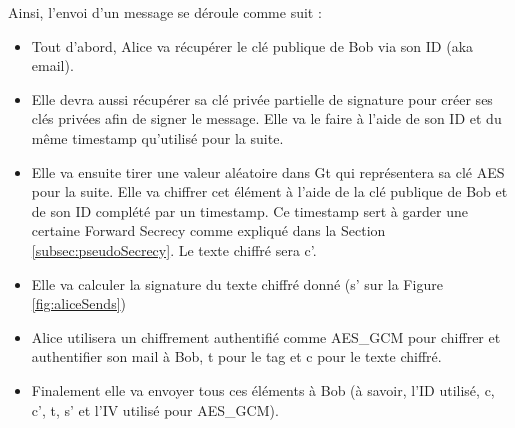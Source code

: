 Ainsi, l'envoi d'un message se déroule comme suit :
\begin{itemize}
	\item Tout d'abord, Alice va récupérer le clé publique de Bob via son ID (aka email).
	\item Elle devra aussi récupérer sa clé privée partielle de signature pour créer ses clés privées afin de signer le message. Elle va le faire à l'aide de son ID et du même timestamp qu'utilisé pour la suite.
	\item Elle va ensuite tirer une valeur aléatoire dans Gt qui représentera sa clé AES pour la suite. Elle va chiffrer cet élément à l'aide de la clé publique de Bob et de son ID complété par un timestamp. Ce timestamp sert à garder une certaine Forward Secrecy comme expliqué dans la Section \ref{subsec:pseudoSecrecy}. Le texte chiffré sera c'.
	\item Elle va calculer la signature du texte chiffré donné (s' sur la Figure \ref{fig:aliceSends})
	\item Alice utilisera un chiffrement authentifié comme AES\_GCM pour chiffrer et authentifier son mail à Bob, t pour le tag et c pour le texte chiffré.
	\item Finalement elle va envoyer tous ces éléments à Bob (à savoir, l'ID utilisé, c, c', t, s' et l'IV utilisé pour AES\_GCM).
\end{itemize}


